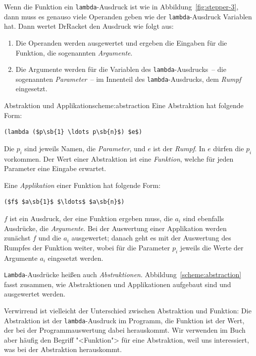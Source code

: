 Wenn die Funktion ein \lstinline{lambda}-Ausdruck ist wie in
Abbildung~\ref{fig:stepper-3}, dann muss es genauso viele Operanden
geben wie der \lstinline{lambda}-Ausdruck Variablen hat.
Dann wertet DrRacket den Ausdruck wie folgt aus:
%
\begin{enumerate}
\item Die Operanden werden ausgewertet und ergeben die Eingaben für
  die Funktion, die sogenannten
  \textit{Argumente}.\label{sec:argument}
\item Die Argumente werden für die
  Variablen des \lstinline{lambda}-Ausdrucks~-- die sogenannten
  \textit{Parameter}~-- im Innenteil des
  \lstinline{lambda}-Ausdrucks, dem \textit{Rumpf}
  eingesetzt.
\end{enumerate}
%
\begin{feature}{Abstraktion und Applikation}{scheme:abstraction}
  Eine Abstraktion hat folgende Form:
\begin{lstlisting}
(lambda ($p\sb{1} \ldots p\sb{n}$) $e$)
\end{lstlisting}
  Die $p_i$ sind jeweils Namen, die \textit{Parameter}, und
  $e$ ist der \textit{Rumpf}.  In $e$ dürfen die $p_i$
  vorkommen.  Der Wert einer Abstraktion ist eine \textit{Funktion},
  welche für jeden Parameter eine Eingabe erwartet.

  Eine \textit{Applikation} einer Funktion hat folgende Form:
\begin{lstlisting}
($f$ $a\sb{1}$ $\ldots$ $a\sb{n}$)
\end{lstlisting}
  $f$ ist ein Ausdruck, der eine Funktion ergeben muss, die $a_i$ sind
  ebenfalls Ausdrücke, die \textit{Argumente}.  Bei
  der Auswertung einer Applikation werden zunächst $f$ und die $a_i$
  ausgewertet; danach geht es mit der Auswertung des Rumpfes der
  Funktion weiter, wobei für die Parameter $p_i$ jeweils die Werte der
  Argumente $a_i$ eingesetzt werden.
\end{feature}
%
\lstinline{Lambda}-Ausdrücke heißen auch
\textit{Abstraktionen}.
Abbildung~\ref{scheme:abstraction} fasst zusammen, wie Abstraktionen
und Applikationen aufgebaut sind und ausgewertet werden.

Verwirrend ist vielleicht der Unterschied zwischen Abstraktion und
Funktion: Die Abstraktion ist der \lstinline{lambda}-Ausdruck im
Programm, die Funktion ist der Wert, der bei der Programmauswertung
dabei herauskommt.  Wir verwenden im Buch aber häufig den Begriff
"<Funktion"> für eine Abstraktion, weil uns interessiert, was bei der
Abstraktion herauskommt.

